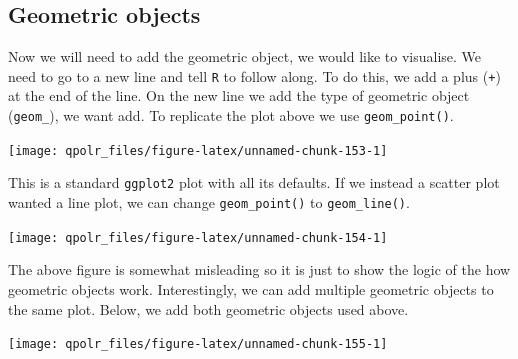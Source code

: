 \documentclass[12pt,oneside]{reedthesis}
\theoremstyle{definition}
\theoremstyle{definition}
\theoremstyle{definition}
\theoremstyle{remark}
\begin{document}
  \subsection{Geometric objects}\label{geometric-objects}
  
  Now we will need to add the geometric object, we would like to
  visualise. We need to go to a new line and tell \texttt{R} to follow
  along. To do this, we add a plus (\texttt{+}) at the end of the line. On
  the new line we add the type of geometric object (\texttt{geom\_}), we
  want add. To replicate the plot above we use \texttt{geom\_point()}.
  \begin{Shaded}
  \begin{Highlighting}[]
  \NormalTok{(}\OperatorTok{+}
  \StringTok{  }\NormalTok{()}
  \end{Highlighting}
  \end{Shaded}
  \begin{center}\texttt{[image: qpolr\_files/figure-latex/unnamed-chunk-153-1]} \end{center}
  
  This is a standard \texttt{ggplot2} plot with all its defaults. If we
  instead a scatter plot wanted a line plot, we can change
  \texttt{geom\_point()} to \texttt{geom\_line()}.
  \begin{Shaded}
  \begin{Highlighting}[]
  \NormalTok{(}\OperatorTok{+}
  \StringTok{  }\NormalTok{()}
  \end{Highlighting}
  \end{Shaded}
  \begin{center}\texttt{[image: qpolr\_files/figure-latex/unnamed-chunk-154-1]} \end{center}
  
  The above figure is somewhat misleading so it is just to show the logic
  of the how geometric objects work. Interestingly, we can add multiple
  geometric objects to the same plot. Below, we add both geometric objects
  used above.
  \begin{Shaded}
  \begin{Highlighting}[]
  \NormalTok{(}\OperatorTok{+}
  \StringTok{  }\NormalTok{() }\OperatorTok{+}
  \StringTok{  }\NormalTok{()}
  \end{Highlighting}
  \end{Shaded}
  \begin{center}\texttt{[image: qpolr\_files/figure-latex/unnamed-chunk-155-1]} \end{center}
  
\end{document}
